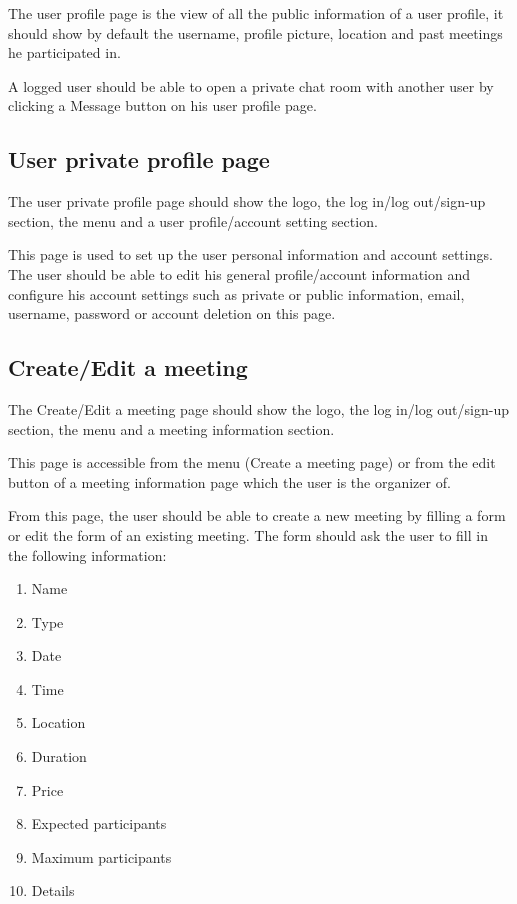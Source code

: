 \documentclass[conference]{IEEEtran}
\begin{document}
The user profile page is the view of all the public information of a user profile, it should show by default the username, profile picture, location and past meetings he participated in.

A logged user should be able to open a private chat room with another user by clicking a Message button on his user profile page.

\subsection{User private profile page}

The user private profile page should show the logo, the log in/log out/sign-up section, the menu and a user profile/account setting section.

This page is used to set up the user personal information and account settings. 
The user should be able to edit his general profile/account information and configure his account settings such as private or public information, email, username, password or account deletion on this page.

\subsection{Create/Edit a meeting}

The Create/Edit a meeting page should show the logo, the log in/log out/sign-up section, the menu and a meeting information section.

This page is accessible from the menu (Create a meeting page) or from the edit button of a meeting information page which the user is the organizer of.

From this page, the user should be able to create a new meeting by filling a form or edit the form of an existing meeting.
The form should ask the user to fill in the following information:

\begin{enumerate}
    \item Name
    \item Type
    \item Date
    \item Time
    \item Location
    \item Duration
    \item Price
    \item Expected participants
    \item Maximum participants
    \item Details
\end{enumerate}
\end{document}
